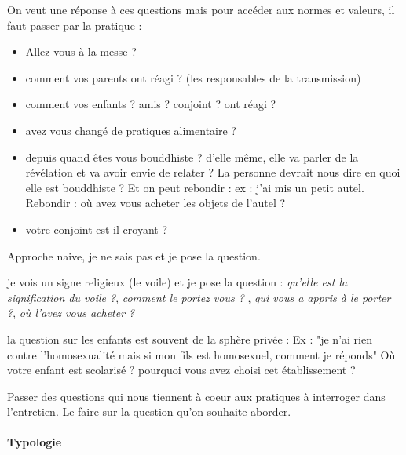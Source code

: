 On veut une réponse à ces questions mais pour accéder aux normes et valeurs, il faut passer par la pratique :
\begin{itemize}
\item Allez vous à la messe ?
\item comment vos parents ont réagi ? (les responsables de la transmission)
\item comment vos enfants ? amis ? conjoint ? ont réagi ?
\item avez vous changé de pratiques alimentaire ? 
\item depuis quand êtes vous bouddhiste ? d'elle même, elle va parler de la révélation et va avoir envie de relater ? La personne devrait nous dire en quoi elle est bouddhiste ? Et on peut rebondir : ex : j'ai mis un petit autel. Rebondir : où avez vous acheter les objets de l'autel ?
\item votre conjoint est il croyant ?

\end{itemize}

\begin{Def}
Approche naive, je ne sais pas et je pose la question.
\end{Def}

je vois un signe religieux (le voile) et je pose la question : \textit{qu'elle est la signification du voile ?}, \textit{comment le portez vous ? }, \textit{qui vous a appris à le porter ?}, \textit{où l'avez vous acheter ?}

\begin{Prop}
la question sur les enfants est souvent de la sphère privée : Ex : "je n'ai rien contre l'homosexualité mais si mon fils est homosexuel, comment je réponds"
Où votre enfant est scolarisé ? pourquoi vous avez choisi cet établissement ?

\end{Prop}

\begin{Exo}
Passer des questions qui nous tiennent à coeur aux pratiques à interroger dans l'entretien.
Le faire sur la question qu'on souhaite aborder.
\end{Exo}


\paragraph{Typologie}

